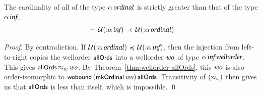 \documentclass[11pt]{llncs}
\renewcommand{\HOLConst}[1]{{\textsf{\upshape\small #1}}}
\renewcommand{\HOLTyOp}[1]{\mbox{\fontencoding{T1}\fontfamily{bch}\fontseries{m}\fontshape{it}\fontsize{9.5}{10}\selectfont #1}}
\renewcommand{\HOLinline}[1]{\ensuremath{#1}}
\newenvironment{holmath}{\begin{displaymath}\begin{array}{l}}{\end{array}\end{displaymath}\ignorespacesafterend}
\begin{document}
\begin{theorem}
\label{thm:univ-over-greater-cardinal}
The cardinality of all of the type \HOLinline{\ensuremath{\alpha}\,\HOLTyOp{ordinal}} is strictly greater than that of the type \HOLinline{\ensuremath{\alpha}\,\HOLTyOp{inf}}.
\begin{holmath}
\HOLTokenTurnstile{}\,\ensuremath{\cal{U}}(\ensuremath{{:}}\ensuremath{\alpha}\,\HOLTyOp{inf})\,\ensuremath{\prec}\,\ensuremath{\cal{U}}(\ensuremath{{:}}\ensuremath{\alpha}\,\HOLTyOp{ordinal})
\end{holmath}
\end{theorem}
\begin{proof} By contradiction.
If \HOLinline{\ensuremath{\cal{U}}(\ensuremath{{:}}\ensuremath{\alpha}\,\HOLTyOp{ordinal})\,\ensuremath{{\,\HOLTokenIsPrefix\,}}\,\ensuremath{\cal{U}}(\ensuremath{{:}}\ensuremath{\alpha}\,\HOLTyOp{inf})}, then the injection from left-to-right copies the wellorder \HOLinline{\HOLConst{allOrds}} into a wellorder \HOLinline{\HOLFreeVar{wo}} of type \HOLinline{\ensuremath{\alpha}\,\HOLTyOp{inf}\,\HOLTyOp{wellorder}}.
This gives \HOLinline{\HOLConst{allOrds}\,\ensuremath{{\approx_w}}\,\HOLFreeVar{wo}}.
By Theorem~\ref{thm:wellorder-allOrds}, this \HOLinline{\HOLFreeVar{wo}} is also order-isomorphic to \HOLinline{\HOLConst{wobound}\,(\HOLConst{mkOrdinal}\,\HOLFreeVar{wo})\,\HOLConst{allOrds}}.
Transitivity of \HOLinline{(\HOLConst{\ensuremath{{\approx_w}}})} then gives us that \HOLinline{\HOLConst{allOrds}} is less than itself, which is impossible.
\qed
\end{proof}
\end{document}
